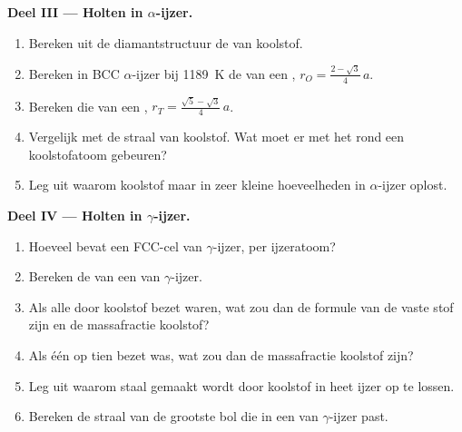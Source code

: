 \begin{problem}
\medskip
\noindent\textbf{Deel III --- Holten in $\alpha$-ijzer.}
\begin{enumerate}[resume]
  \item Bereken uit de diamantstructuur de  van koolstof.
  \item Bereken in BCC $\alpha$-ijzer bij \qty{1189}{K} de 
        van een , $r_O = \frac{2 - \sqrt3}{4}\,a$.
  \item Bereken die van een , $r_T = \frac{\sqrt5 -
        \sqrt3}{4}\,a$.
  \item Vergelijk met de straal van koolstof. Wat moet er met het 
        rond een koolstofatoom gebeuren?
  \item Leg uit waarom koolstof maar in zeer kleine hoeveelheden in
        $\alpha$-ijzer oplost.
\end{enumerate}

\medskip
\noindent\textbf{Deel IV --- Holten in $\gamma$-ijzer.}
\begin{enumerate}[resume]
  \item Hoeveel  bevat een FCC-cel van $\gamma$-ijzer,
        per ijzeratoom?
  \item Bereken de  van een  van
        $\gamma$-ijzer.
  \item Als alle  door koolstof bezet waren, wat zou
        dan de formule van de vaste stof zijn en de massafractie koolstof?
  \item Als één  op tien bezet was, wat zou dan de
        massafractie koolstof zijn?
  \item Leg uit waarom staal gemaakt wordt door koolstof in heet ijzer op
        te lossen.
  \item Bereken de straal van de grootste bol die in een  van $\gamma$-ijzer past.
\end{enumerate}
\end{problem}
